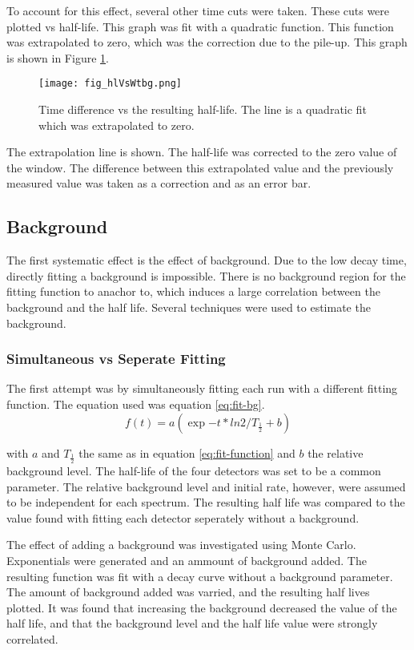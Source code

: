 To account for this effect, several other time cuts were taken.
These cuts were plotted vs half-life.
This graph was fit with a quadratic function.
This function was extrapolated to zero, which was the correction due to the pile-up.
This graph is shown in Figure \ref{fig:timediffvhl}. 

\begin{figure}[!htb]
\centerline{\texttt{[image: fig\_hlVsWtbg.png]}}
\caption{Time difference vs the resulting half-life.
	 The line is a quadratic fit which was extrapolated to zero.
	}
\label{fig:timediffvhl}
\end{figure}
 
The extrapolation line is shown.
The half-life was corrected to the zero value of the window.
The difference between this extrapolated value and the previously measured value was taken as a correction and as an error bar.
 
\subsection{Background}

The first systematic effect is the effect of background.
Due to the low decay time, directly fitting a background is impossible.
There is no background region for the fitting function to anachor to, which induces a large correlation between the background and the half life.
Several techniques were used to estimate the background.

\subsubsection{Simultaneous vs Seperate Fitting}
The first attempt was by simultaneously fitting each run with a different fitting function.
The equation used was equation \ref{eq:fit-bg}. 
%
\begin{equation}
	f(t) = a(\exp{-t*ln2/T_{\frac{1}{2}}} + b)
	\label{eq:fit-bg}
\end{equation}
%

with $a$ and $T_{\frac{1}{2}}$ the same as in equation \ref{eq:fit-function} and $b$ the relative background level.
The half-life of the four detectors was set to be a common parameter. 
The relative background level and initial rate, however, were assumed to be independent for each spectrum.
The resulting half life was compared to the value found with fitting each detector seperately without a background.

The effect of adding a background was investigated using Monte Carlo.
Exponentials were generated and an ammount of background added.
The resulting function was fit with a decay curve without a background parameter.
The amount of background added was varried, and the resulting half lives plotted.
It was found that increasing the background decreased the value of the half life, and that the background level and the half life value were strongly correlated.

